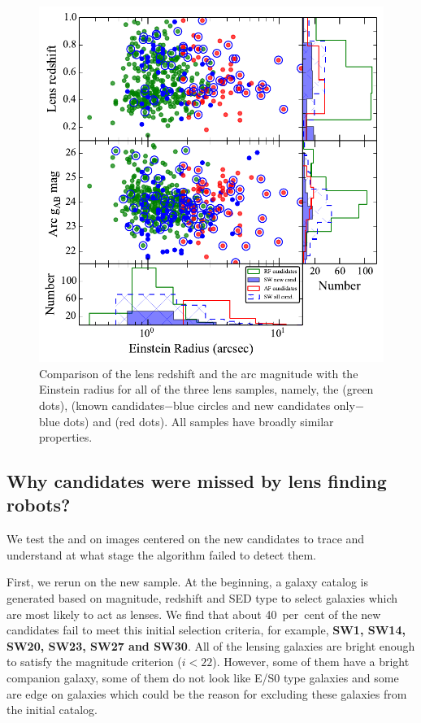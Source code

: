 \documentclass[useAMS,usenatbib,a4paper]{mn2e}
\begin{document}
\begin{figure}
\begin{center}
\includegraphics[scale=0.65]{zl_mg_re.pdf}
\caption{ \label{fig:zlmgre}
Comparison of the lens redshift and the arc magnitude with the
Einstein radius for all of the three lens samples, namely, the \rf (green dots),
\sw (known candidates$-$blue circles and new candidates only$-$blue dots)
and \af (red dots). All samples have broadly similar properties.}
\end{center}
\end{figure}

\subsection{Why \sw candidates were missed by lens finding robots?}
We test the \rf and \af on images centered on the new \sw candidates to
trace and understand at what stage the algorithm failed to detect them.

First, we rerun \rf on the new \sw sample. At the beginning, a galaxy
catalog is generated based on magnitude, redshift and SED type
\citep[see]{Gavazzi2014} to select galaxies which are most likely to act
as lenses. We find that about 40~per~cent of the new \sw candidates fail to
meet this initial selection criteria, for example, {\bf SW1, SW14, SW20,
SW23, SW27 and SW30}. All of the lensing galaxies are bright enough to
satisfy the magnitude criterion ($i<22$). However, some of them have a
bright companion galaxy, some of them do not look like E/S0 type
galaxies and some are edge on galaxies which could be the reason for
excluding these galaxies from the initial catalog.
\end{document}
